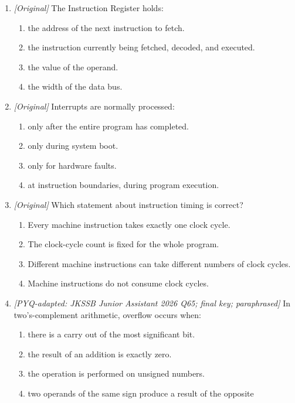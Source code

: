 \documentclass[11pt]{article}
\begin{document}
\begin{enumerate}[label=\textbf{Q\arabic*.}, leftmargin=*]
\begin{enumerate}[label=\Alph*.]
    \item the last instruction that finished executing.
  \end{enumerate}
\item \textit{[Original]} The Instruction Register holds:
  \begin{enumerate}[label=\Alph*.]
    \item the address of the next instruction to fetch.
    \item the instruction currently being fetched, decoded, and executed.
    \item the value of the operand.
    \item the width of the data bus.
  \end{enumerate}
\item \textit{[Original]} Interrupts are normally processed:
  \begin{enumerate}[label=\Alph*.]
    \item only after the entire program has completed.
    \item only during system boot.
    \item only for hardware faults.
    \item at instruction boundaries, during program execution.
  \end{enumerate}
\item \textit{[Original]} Which statement about instruction timing is correct?
  \begin{enumerate}[label=\Alph*.]
    \item Every machine instruction takes exactly one clock cycle.
    \item The clock-cycle count is fixed for the whole program.
    \item Different machine instructions can take different numbers of clock
      cycles.
    \item Machine instructions do not consume clock cycles.
  \end{enumerate}
\item \textit{[PYQ-adapted: JKSSB Junior Assistant 2026 Q65; final key;
paraphrased]} In two's-complement arithmetic, overflow occurs when:
  \begin{enumerate}[label=\Alph*.]
    \item there is a carry out of the most significant bit.
    \item the result of an addition is exactly zero.
    \item the operation is performed on unsigned numbers.
    \item two operands of the same sign produce a result of the opposite

\end{enumerate}
\end{enumerate}
\end{document}
